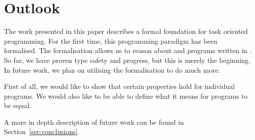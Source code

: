 
\section{Outlook}


The work presented in this paper describes a formal foundation for task oriented programming.
For the first time, this programming paradigm has been formalised.
The formalisation allows us to reason about \TOP and programs written in \TOPHAT.
So far, we have proven type safety and progress, but this is merely the beginning.
In future work, we plan on utilising the formalisation to do much more.

First of all, we would like to show that certain properties hold for individual programs.
We would also like to be able to define what it means for programs to be equal.

A more in depth description of future work can be found in Section~\ref{sec:conclusions}.
